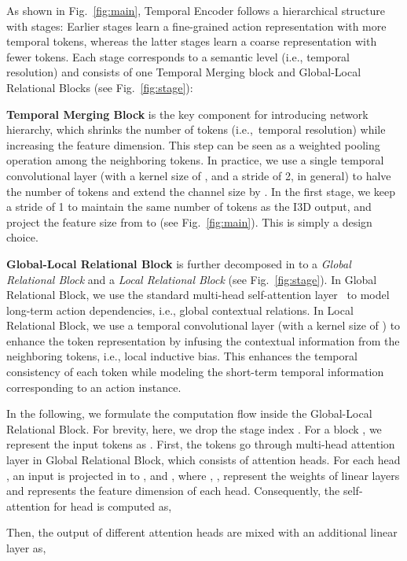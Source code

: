 \documentclass[10pt,twocolumn,letterpaper]{article}
\begin{document}
As shown in Fig.~\ref{fig:main}, Temporal Encoder follows a hierarchical structure with  stages: Earlier stages learn a fine-grained action representation with more temporal tokens, whereas the latter stages learn a coarse representation with fewer tokens. 
Each stage corresponds to a semantic level (i.e., temporal resolution) and consists of one Temporal Merging block and  Global-Local Relational Blocks (see Fig.~\ref{fig:stage}): 

\noindent\textbf{Temporal Merging Block} is the key component for introducing network hierarchy, which shrinks the number of tokens (i.e.,~temporal resolution) while increasing the feature dimension. 
This step can be seen as a weighted pooling operation among the neighboring tokens. 
In practice, we use a single temporal convolutional layer (with a kernel size of , and a stride of 2, in general) to halve the number of tokens and extend the channel size by . 
In the first stage, we keep a stride of 1 to maintain the same number of tokens as the I3D output, and project the feature size from  to  (see Fig.~\ref{fig:main}). This is simply a design choice. 

\noindent\textbf{Global-Local Relational Block} is further decomposed in to a \textit{Global Relational Block} and a \textit{Local Relational Block} (see Fig.~\ref{fig:stage}). 
In Global Relational Block, we use the standard multi-head self-attention layer~\cite{transformer} to model long-term action dependencies, i.e., global contextual relations. 
In Local Relational Block, we use a temporal convolutional layer (with a kernel size of ) to enhance the token representation by infusing the contextual information from the neighboring tokens, i.e., local inductive bias. This enhances the temporal consistency of each token while modeling the short-term temporal information corresponding to an action instance.


In the following, we formulate the computation flow inside the Global-Local Relational Block. For brevity, here, we drop the stage index . 
For a block , we represent the input tokens as . First, the tokens go through multi-head attention layer in Global Relational Block, which consists of  attention heads. 
For each head , an input  is projected in to ,  and , where , ,  represent the weights of linear layers and  represents the feature dimension of each head. 
Consequently, the self-attention for head  is computed as,

Then, the output of different attention heads are mixed with an additional linear layer as,
\end{document}
